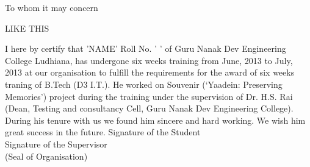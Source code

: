 
\begin{Large}{To whom it may concern }
\end{Large}

LIKE THIS

I here by certify that 'NAME' Roll No. '  '  of Guru Nanak Dev Engineering
College Ludhiana, has undergone six weeks training from June, 2013 to July, 2013 at
our organisation to fulfill the requirements for the award of six weeks traning of B.Tech (D3 I.T.).
He worked on Souvenir (‘Yaadein: Preserving Memories’) project during the training under the
supervision of Dr. H.S. Rai (Dean, Testing and consultancy Cell, Guru Nanak Dev
Engineering College). During his tenure with us we found him sincere and hard working. We wish him great success in the future.
\vskip 2.0cm
Signature of the Student\\
\vskip 2.0cm
Signature of the Supervisor\\
\vskip 2.0cm
(Seal of Organisation)

